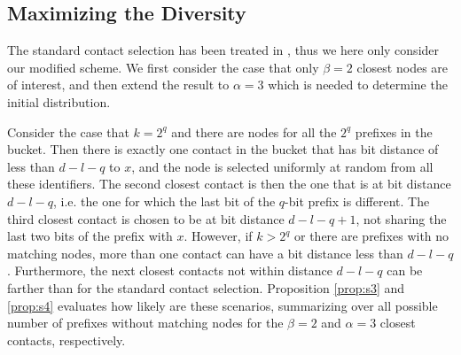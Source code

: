 \documentclass[10pt, conference, compsocconf, letterpaper]{IEEEtran}
\begin{document}
\subsection{Maximizing the Diversity} \label{sec:modeltransition}
The standard contact selection has been treated in \cite{roos13comprehending}, thus we here only consider our modified scheme. We first consider the case that only $\beta=2$ closest nodes are of interest, and then extend the result to $\alpha=3$ which is needed to determine the initial distribution.

Consider the case that $k=2^q$ and there are nodes for all the $2^q$ prefixes in the bucket.
Then there is exactly one contact in the bucket that has bit distance of less than
$d-l-q$ to $x$, and the node is selected uniformly at random from all these identifiers.
The second closest contact is then the one that is at bit distance $d-l-q$, i.e. the one
for which the last bit of the $q$-bit prefix is different. The third closest contact is chosen to be at bit distance $d-l-q+1$, not sharing the last two bits of the prefix with $x$. However, if $k>2^q$ or there are prefixes with no matching nodes, more than one contact can have a bit distance less than $d-l-q$. Furthermore, the next closest contacts not within distance $d-l-q$ can be farther than for the standard contact selection. 
Proposition \ref{prop:s3} and \ref{prop:s4} evaluates how likely are these scenarios, summarizing over all possible number of prefixes without matching nodes for the $\beta=2$ and $\alpha=3$ closest contacts, respectively.
\vspace{3pt}
\end{document}
